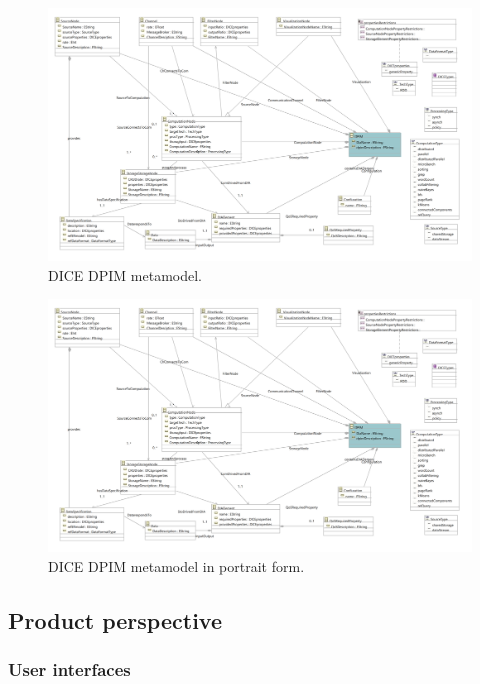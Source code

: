
\begin{figure}
\centering
\includegraphics[width=\textwidth]{Images/11.png}
\caption{\label{fig:metamodel}DICE DPIM metamodel.}
\end{figure}

\begin{figure}
\centering
\includegraphics[width=\textwidth]{Images/11.png}
\caption{\label{fig:metamodel2}DICE DPIM metamodel in portrait form.}
\end{figure}


\subsection{Product perspective}

\subsubsection{User interfaces}

